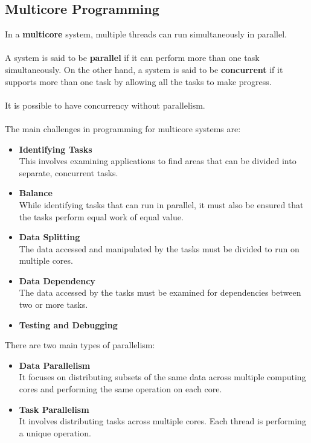 \documentclass{article}
\begin{document}
\subsection{Multicore Programming}
In a \textbf{multicore} system, multiple threads can run simultaneously in parallel. \\ \\
 A system is said to be \textbf{parallel} if it can perform more than one task simultaneously. On the other hand, a system is said to be \textbf{concurrent} if it supports more than one task by allowing all the tasks to make progress. \\ \\
It is possible to have concurrency without parallelism. \\ \\
The main challenges in programming for multicore systems are:

\begin{itemize}
	\item \textbf{Identifying Tasks}
	\vspace{.2cm} \\
	This involves examining applications to find areas that can be divided into separate, concurrent tasks.
	
	\item \textbf{Balance}
	\vspace{.2cm} \\
	While identifying tasks that can run in parallel, it must also be ensured that the tasks perform equal work of equal value.
	
	\item \textbf{Data Splitting}
	\vspace{.2cm} \\
	The data accessed and manipulated by the tasks must be divided to run on multiple cores.
	
	\item \textbf{Data Dependency}
	\vspace{.2cm} \\
	The data accessed by the tasks must be examined for dependencies between two or more tasks.
	
	\item \textbf{Testing and Debugging}
\end{itemize}
There are two main types of parallelism:

\begin{itemize}
	\item \textbf{Data Parallelism}
	\vspace{.2cm} \\
	It focuses on distributing subsets of the same data across multiple computing cores and performing the same operation on each core.
	
	\item \textbf{Task Parallelism}
	\vspace{.2cm} \\
	It involves distributing tasks across multiple cores. Each thread is performing a unique operation.
\end{itemize}
\end{document}
